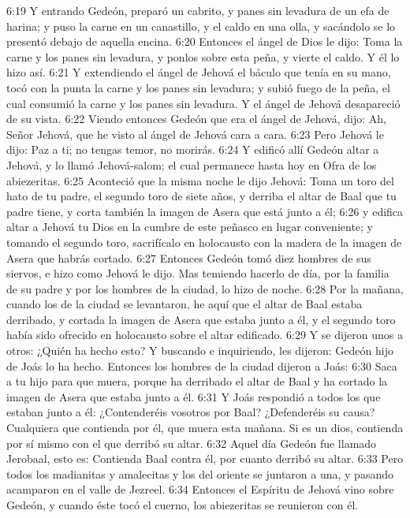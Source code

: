 6:19 Y entrando Gedeón, preparó un cabrito, y panes sin levadura de un efa   de harina; y puso la carne en un canastillo, y el caldo en una olla, y sacándolo se lo presentó debajo de aquella encina.  
6:20 Entonces el ángel de Dios le dijo: Toma la carne y los panes sin levadura, y ponlos sobre esta peña, y vierte el caldo. Y él lo hizo así.  
6:21 Y extendiendo el ángel de Jehová el báculo que tenía en su mano, tocó con la punta la carne y los panes sin levadura; y subió fuego de la peña, el cual consumió la carne y los panes sin levadura. Y el ángel de Jehová desapareció de su vista.  
6:22 Viendo entonces Gedeón que era el ángel de Jehová, dijo: Ah, Señor Jehová, que he visto al ángel de Jehová cara a cara. 
6:23 Pero Jehová le dijo: Paz a ti; no tengas temor, no morirás.  
6:24 Y edificó allí Gedeón altar a Jehová, y lo llamó Jehová-salom; el cual permanece hasta hoy en Ofra de los abiezeritas.  
6:25 Aconteció que la misma noche le dijo Jehová: Toma un toro del hato de tu padre, el segundo toro de siete años, y derriba el altar de Baal que tu padre tiene, y corta también la imagen de Asera que está junto a él;  
6:26 y edifica altar a Jehová tu Dios en la cumbre de este peñasco en lugar conveniente; y tomando el segundo toro, sacrifícalo en holocausto con la madera de la imagen de Asera que habrás cortado.  
6:27 Entonces Gedeón tomó diez hombres de sus siervos, e hizo como Jehová le dijo. Mas temiendo hacerlo de día, por la familia de su padre y por los hombres de la ciudad, lo hizo de noche.  
6:28 Por la mañana, cuando los de la ciudad se levantaron, he aquí que el altar de Baal estaba derribado, y cortada la imagen de Asera que estaba junto a él, y el segundo toro había sido ofrecido en holocausto sobre el altar edificado.  
6:29 Y se dijeron unos a otros: ¿Quién ha hecho esto? Y buscando e inquiriendo, les dijeron: Gedeón hijo de Joás lo ha hecho. Entonces los hombres de la ciudad dijeron a Joás:  
6:30 Saca a tu hijo para que muera, porque ha derribado el altar de Baal y ha cortado la imagen de Asera que estaba junto a él.  
6:31 Y Joás respondió a todos los que estaban junto a él: ¿Contenderéis vosotros por Baal? ¿Defenderéis su causa? Cualquiera que contienda por él, que muera esta mañana. Si es un dios, contienda por sí mismo con el que derribó su altar.  
6:32 Aquel día Gedeón fue llamado Jerobaal, esto es: Contienda Baal contra él, por cuanto derribó su altar.  
6:33 Pero todos los madianitas y amalecitas y los del oriente se juntaron a una, y pasando acamparon en el valle de Jezreel.  
6:34 Entonces el Espíritu de Jehová vino sobre Gedeón, y cuando éste tocó el cuerno, los abiezeritas se reunieron con él.  
